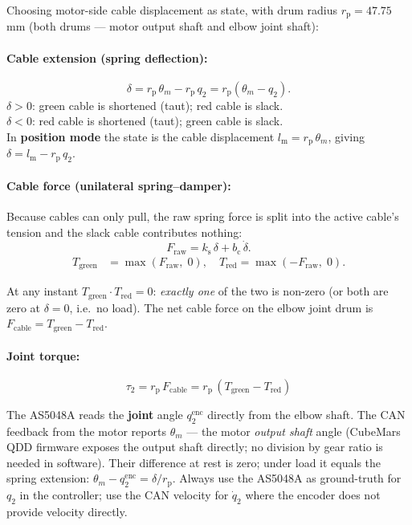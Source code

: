 \documentclass[11pt,a4paper]{article}
\newcommand{\rp}{r_{\mathrm{p}}}
\newcommand{\ks}{k_{\mathrm{s}}}
\newcommand{\bc}{b_{\mathrm{c}}}
\newcommand{\lm}{l_{\mathrm{m}}}
\begin{document}
Choosing motor-side cable displacement as state, with drum radius
$\rp = 47.75$\,mm (both drums — motor output shaft and elbow joint shaft):

\paragraph{Cable extension (spring deflection):}
\begin{equation}
  \delta = \rp\,\theta_m - \rp\,q_2
         = \rp(\theta_m - q_2).
  \label{eq:delta_drive}
\end{equation}
$\delta > 0$: green cable is shortened (taut); red cable is slack.\\
$\delta < 0$: red cable is shortened (taut); green cable is slack.\\
In \textbf{position mode} the state is the cable displacement
$\lm = \rp\,\theta_m$, giving $\delta = \lm - \rp\,q_2$.

\paragraph{Cable force (unilateral spring–damper):}

Because cables can only pull, the raw spring force is split into the active
cable's tension and the slack cable contributes nothing:
\begin{equation}
  F_{\mathrm{raw}} = \ks\,\delta + \bc\,\dot{\delta}.
  \label{eq:fraw}
\end{equation}
\begin{align}
  T_{\mathrm{green}} &= \max(F_{\mathrm{raw}},\;0),\quad
  T_{\mathrm{red}}   = \max(-F_{\mathrm{raw}},\;0).
  \label{eq:unilateral}
\end{align}

At any instant $T_{\mathrm{green}}\cdot T_{\mathrm{red}} = 0$: \emph{exactly
one} of the two is non-zero (or both are zero at $\delta = 0$, i.e.\ no load).
The net cable force on the elbow joint drum is
$F_{\mathrm{cable}} = T_{\mathrm{green}} - T_{\mathrm{red}}$.

\paragraph{Joint torque:}
\begin{equation}
  \boxed{\tau_2 = \rp\,F_{\mathrm{cable}} = \rp\,(T_{\mathrm{green}} - T_{\mathrm{red}})}
  \label{eq:tau2_drive}
\end{equation}

\begin{warnbox}
  The AS5048A reads the \textbf{joint} angle $q_2^{\mathrm{enc}}$ directly from the elbow shaft.
  The CAN feedback from the motor reports $\theta_m$ --- the motor
  \emph{output shaft} angle (CubeMars QDD firmware exposes the output shaft directly;
  no division by gear ratio is needed in software).
  Their difference at rest is zero; under load it equals the spring
  extension:  $\theta_m - q_2^{\mathrm{enc}} = \delta/\rp$.
  Always use the AS5048A as ground-truth for $q_2$ in the controller;
  use the CAN velocity for $\dot{q}_2$ where the encoder does not
  provide velocity directly.
\end{warnbox}
\end{document}
